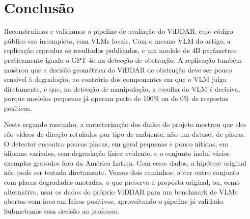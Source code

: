 \documentclass[journal,onecolumn]{IEEEtran}
\begin{document}
\section{Conclusão}
Reconstruímos e validamos o pipeline de avaliação do ViDDAR, cujo código público era incompleto, com
VLMs locais. Com o mesmo VLM do artigo, a replicação reproduz os resultados publicados, e um modelo de
4B parâmetros praticamente iguala o GPT-4o na detecção de obstrução. A replicação também mostrou que a
decisão geométrica do ViDDAR de obstrução deve ser pouco sensível à degradação, ao contrário dos
componentes em que o VLM julga diretamente, e que, na detecção de manipulação, a escolha do VLM é
decisiva, porque modelos pequenos já operam perto de 100\% ou de 0\% de respostas positivas.

Neste segundo rascunho, a caracterização dos dados do projeto mostrou que eles são vídeos de direção
rotulados por tipo de ambiente, não um dataset de placas. O detector encontra poucas placas, em geral
pequenas e pouco nítidas, em idiomas variados, sem degradação física evidente, e o conjunto inclui
vários exemplos gravados fora da América Latina. Com esses dados, a hipótese original não pode ser
testada diretamente. Vemos dois caminhos: obter outro conjunto com placas degradadas anotadas, o que
preserva a proposta original, ou, como alternativa, usar os dados do próprio ViDDAR para um benchmark
de VLMs abertos com foco em falsos positivos, aproveitando o pipeline já validado. Submetemos essa
decisão ao professor.
\end{document}
